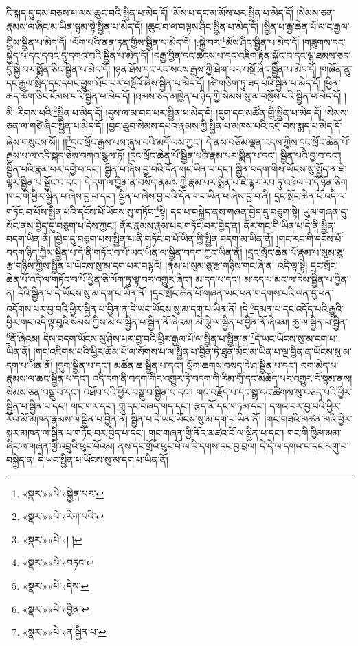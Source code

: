 ཇི་སྐད་དུ་དམ་བཅས་པ་ལས་ཆུང་བའི་སྦྱིན་པ་མེད་དོ། །མོས་པ་དང་མ་མོས་པར་སྦྱིན་པ་མེད་དོ། །སེམས་ཅན་རྣམས་ལ་ཞིང་མ་ཡིན་སྙམ་སྟེ་སྦྱིན་པ་མེད་དོ། །ཆུང་བ་ལ་བལྟས་ཤིང་སྦྱིན་པ་མེད་དོ། །སྦྱིན་པ་རྒྱ་ཆེན་པོ་ལ་ང་རྒྱལ་གྱིས་སྦྱིན་པ་མེད་དོ། །ལོག་པའི་ནན་ཏན་གྱིས་སྦྱིན་པ་མེད་དོ། །:སྐྱེ་བར་\footnote{«སྣར་»«པེ་»སྐྱེན་པར་}མོས་ཤིང་སྦྱིན་པ་མེད་དོ། །གཟུགས་དང་སྐྱེད་པ་དང་དབང་དུ་དགའ་བའི་སྦྱིན་པ་མེད་དོ། །བརྒྱ་བྱིན་དང་ཚངས་པ་དང་འཇིག་རྟེན་སྐྱོང་བ་དང་ལྷ་ཐམས་ཅད་དུ་སྐྱེ་བར་སྨོན་ཅིང་སྦྱིན་པ་མེད་དོ། །ཉན་ཐོས་དང་རང་སངས་རྒྱས་ཀྱི་ཐེག་པར་བསྔོ་ཞིང་སྦྱིན་པ་མེད་དོ། །གཞོན་ནུ་དང་རྒྱལ་སྲིད་དང་དབང་ཕྱུག་ཐོབ་པར་བསྔོའོ་ཞེས་སྦྱིན་པ་མེད་དོ། །ཚེ་གཅིག་ཏུ་ཟད་པའི་སྦྱིན་པ་མེད་དོ། །ཕྱིན་ཆད་ཆོག་ཅིང་ངོམས་པའི་སྦྱིན་པ་མེད་དོ། །ཐམས་ཅད་མཁྱེན་པ་ཉིད་ཀྱི་སེམས་སུ་མ་བསྔོས་པའི་སྦྱིན་པ་མེད་དོ། །མི་:རིགས་པའི་\footnote{«སྣར་»«པེ་»རིག་པའི་}སྦྱིན་པ་མེད་དོ། །དུས་ལ་མ་བབ་པར་སྦྱིན་པ་མེད་དོ། །དུག་དང་མཚོན་གྱི་སྦྱིན་པ་མེད་དོ། །སེམས་ཅན་ལ་གཙེ་ཞིང་སྦྱིན་པ་མེད་དོ། །བྱང་ཆུབ་སེམས་དཔའ་རྣམས་ཀྱི་སྦྱིན་པ་མཁས་པའི་འགྲོ་བས་སྨད་པ་མེད་དོ་ཞེས་གསུངས་སོ།། །།\footnote{«སྣར་»«པེ་»། །}དྲང་སྲོང་རྒྱས་པས་ཞུས་པའི་མདོ་ལས་ཀྱང་། དེ་ནས་བཅོམ་ལྡན་འདས་ཀྱིས་དྲང་སྲོང་ཆེན་པོ་རྒྱས་པ་ལ་འདི་སྐད་ཅེས་བཀའ་སྩལ་ཏོ། །དྲང་སྲོང་ཆེན་པོ་སྦྱིན་པའི་རྣམ་པར་སྨིན་པ་དང་། སྦྱིན་པའི་བྱ་བ་དང་། སྦྱིན་པའི་རྣམ་པར་དབྱེ་བ་དང་། སྦྱིན་པ་ཞེས་བྱ་བའི་དོན་གང་ཡིན་པ་དང་། སྦྱིན་བདག་གིས་ཡོངས་སུ་སྤྱོད་ན་ཇི་ལྟར་སྦྱིན་པ་སྦྱོང་བ་དང་། དེ་དག་ལ་བྱིན་ན་བསོད་ནམས་ཀྱི་རྣམ་པར་སྨིན་པ་ཇི་ལྟར་རབ་ཏུ་འཕེལ་བ་དེ་ཉོན་ཅིག །གང་གི་ཕྱིར་སྦྱིན་པ་ཞེས་བྱ་བ་དང་། སྦྱིན་པ་ཞེས་བྱ་བའི་དོན་གང་ཡིན་པ་ཞེས་བྱ་བ་ནི། དྲང་སྲོང་ཆེན་པོ་འདི་ལ་གཏོང་བ་པོས་སྦྱིན་པའི་དངོས་པོ་ཡོངས་སུ་གཏོང་\footnote{«སྣར་»«པེ་»བཏང་}སྟེ། དད་པ་བསྐྱེད་ནས་གཞན་བྱེད་དུ་བཅུག་སྟེ། ཡུལ་གཞན་དུ་སོང་ནས་བྱེད་དུ་བཅུག་པ་དེས་ཀྱང་། ནོར་རྣམས་རྣམ་པར་གཏོང་བར་བྱེད་ན། ནོར་གང་གི་ཡིན་པ་དེ་ནི་སྦྱིན་བདག་ཡིན་ནོ། །བྱེད་དུ་བཅུག་པས་སྦྱིན་པ་ནི་གཏོང་བ་པོ་ཡིན་གྱི་སྦྱིན་བདག་མ་ཡིན་ནོ། །གང་རང་གི་དངོས་པོ་བདག་ཉིད་ཀྱིས་སྦྱིན་པ་དེ་ནི་གཏོང་བ་པོ་ཡང་ཡིན་ལ་སྦྱིན་བདག་ཀྱང་ཡིན་ནོ། །དྲང་སྲོང་ཆེན་པོ་རྣམ་པ་སུམ་ཅུ་རྩ་གཉིས་ཀྱིས་སྦྱིན་པ་ཡོངས་སུ་མ་དག་པར་བལྟའོ། །རྣམ་པ་སུམ་ཅུ་རྩ་གཉིས་གང་ཞེ་ན། འདི་ལྟ་སྟེ། དྲང་སྲོང་ཆེན་པོ་འདི་ལ་གཏོང་བ་པོ་ཕྱིན་ཅི་ལོག་ཏུ་ལྟ་བར་འགྱུར་ཞིང་། མ་དད་པ་དང་། མ་དད་པ་མང་ལ་དེས་སྦྱིན་པ་བྱིན་ན། དེའི་སྦྱིན་པ་དེ་ཡོངས་སུ་མ་དག་པ་ཡིན་ནོ། །དྲང་སྲོང་ཆེན་པོ་གཞན་ཡང་ཕན་གདགས་པའི་ལན་དུ་ཕན་འདོགས་པར་བྱ་བའི་ཕྱིར་སྦྱིན་པ་བྱིན་ན་དེ་ཡང་ཡོངས་སུ་མ་དག་པ་ཡིན་ནོ། །དེ་\footnote{«སྣར་»«པེ་»དེས་}དམན་པ་དང་འདོད་པའི་རྒྱུའི་ཕྱིར་གང་འདི་ལྟ་བུའི་སེམས་ཀྱིས་མེ་ལ་སྦྱིན་པ་སྦྱིན་ནོ་ཞེའམ། མེ་ལྕེ་ལ་སྦྱིན་པ་བྱིན་ནོ་ཞེའམ། ཆུ་ལ་སྦྱིན་པ་སྦྱིན་\footnote{«སྣར་»«པེ་»བྱིན་}ནོ་ཞེའམ། དེས་བདག་ཡོངས་སུ་ཤེས་པར་བྱ་བའི་ཕྱིར་རྒྱལ་པོ་ལ་སྦྱིན་པ་སྦྱིན་ན་\footnote{«སྣར་»«པེ་»ན་སྦྱིན་པ་}དེ་ཡང་ཡོངས་སུ་མ་དག་པ་ཡིན་ནོ། །གང་འཇིགས་པའི་ཕྱིར་ཆོམ་པོ་ལ་སོགས་པ་ལ་སྦྱིན་པ་བྱིན་ཏེ་ཐུན་མོང་མ་ཡིན་པ་ལྔ་བྱིན་ན་ཡོངས་སུ་མ་དག་པ་ཡིན་ནོ། །དུག་སྦྱིན་པ་དང་། མཚོན་ཆ་སྦྱིན་པ་དང་། སྲོག་ཆགས་བསད་དེ་ཤ་སྦྱིན་པ་དང་། བག་མེད་པ་རྣམས་ལ་ཆང་སྦྱིན་པ་དང་། འདི་དག་ནི་བདག་གིར་འགྱུར་ཏེ་བདག་གི་རིམ་གྲོ་དང་མཆོད་པར་འགྱུར་རོ་སྙམ་ནས། སེམས་ཅན་བསྡུ་བ་དང་། འཐོབ་པའི་ཕྱིར་བསྡུ་བ་སྦྱིན་པ་དང་། གང་བརྗོད་པ་དང་སྒྲ་དང་ཚིགས་སུ་བཅད་པའི་ཕྱིར་སྦྱིན་པ་སྦྱིན་པ་དང་། གང་གར་དང་། གླུ་དང་བཞད་གད་དང་། རྩད་མོ་དང་གཏམ་དང་། དགའ་བར་བྱ་བའི་ཕྱིར་རོལ་མོ་མཁན་རྣམས་ལ་སྦྱིན་པ་བྱིན་ན། སྦྱིན་པ་དེ་ཡང་ཡོངས་སུ་མ་དག་པ་ཡིན་ནོ། །གང་གཟའི་མཚན་མའི་ཕྱིར་སྐར་མཁན་ལ་སྦྱིན་པ་གཏོང་བར་བྱེད་པ་དང་། གང་གཞན་གྱི་ནོར་མཛའ་བོ་ལ་སྦྱིན་པ་དང་། གང་གི་ཁྱིམ་མམ་ཞིང་ལ་གཞན་གྱི་འབྲུའི་ཕུང་པོའམ། ནས་དང་གྲོའི་ཕུང་པོ་ལ་རི་དགས་དང་བྱ་བྲལ། དེ་དེ་ལ་དགའ་བ་དང་མགུ་བ་བསྐྱེད་ན། དེ་ཡང་སྦྱིན་པ་ཡོངས་སུ་མ་དག་པ་ཡིན་ནོ། 